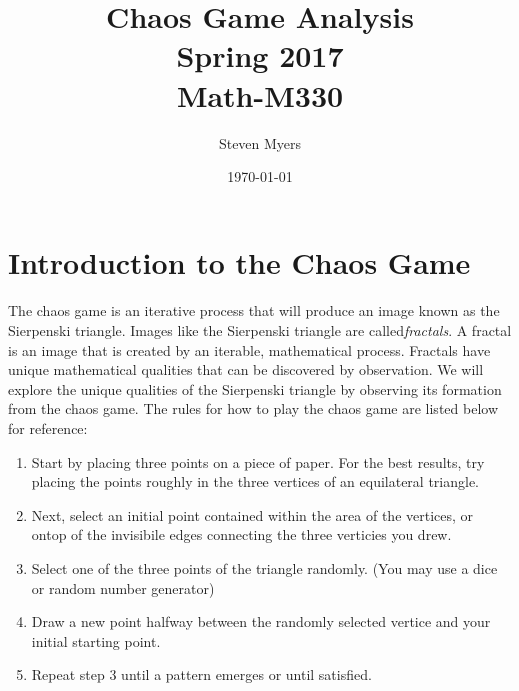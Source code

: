 \documentclass{article}
\begin{document}
\title{Chaos Game Analysis\\ Spring 2017\\ Math-M330}         %
\author{Steven Myers}        %
\date{\today}          %
\maketitle


\makeatother     %

\pagestyle{plain}

\section*{Introduction to the Chaos Game}

\paragraph{}
The chaos game is an iterative process that will produce an image known as the Sierpenski triangle. Images like the Sierpenski triangle are called\textit{fractals}. A fractal is an image that is created by an iterable, mathematical process. Fractals have unique mathematical qualities that can be discovered by observation. We will explore the unique qualities of the Sierpenski triangle by observing its formation from the chaos game. The rules for how to play the chaos game are listed below for reference:
\begin{enumerate}
    \item
    Start by placing three points on a piece of paper. For the best results, try placing the points roughly in the three vertices of an equilateral triangle.
    \item
    Next, select an initial point contained within the area of the vertices, or ontop of the invisibile edges connecting the three verticies you drew.
    \item
    Select one of the three points of the triangle randomly. (You may use a dice or random number generator)
    \item
    Draw a new point halfway between the randomly selected vertice and your initial starting point.
    \item
    Repeat step 3 until a pattern emerges or until satisfied.
\end{enumerate}
\end{document}
